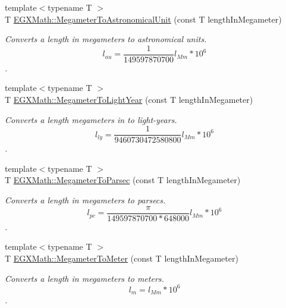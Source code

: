 \begin{DoxyCompactItemize}
\item 
{\footnotesize template$<$typename T $>$ }\\T \mbox{\hyperlink{group___e_g_x_math-_conversions-_length_conversions-_s_i-_megameter-_astronomical_gac7cc4e20e973762cb87a8934184cdf6d}{E\+G\+X\+Math\+::\+Megameter\+To\+Astronomical\+Unit}} (const T length\+In\+Megameter)
\begin{DoxyCompactList}\small\item\em Converts a length in megameters to astronomical units. \[ l_{au}= \frac{1}{149597870700} l_{Mm} * 10^{6} \]. \end{DoxyCompactList}\item 
{\footnotesize template$<$typename T $>$ }\\T \mbox{\hyperlink{group___e_g_x_math-_conversions-_length_conversions-_s_i-_megameter-_astronomical_ga6f5018465cf15f75912695e069b86795}{E\+G\+X\+Math\+::\+Megameter\+To\+Light\+Year}} (const T length\+In\+Megameter)
\begin{DoxyCompactList}\small\item\em Converts a length megameters in to light-\/years. \[ l_{ly}= \frac{1}{9460730472580800} l_{Mm} * 10^{6} \]. \end{DoxyCompactList}\item 
{\footnotesize template$<$typename T $>$ }\\T \mbox{\hyperlink{group___e_g_x_math-_conversions-_length_conversions-_s_i-_megameter-_astronomical_gaec774451afc484c6fa69d2cfcd3dbf06}{E\+G\+X\+Math\+::\+Megameter\+To\+Parsec}} (const T length\+In\+Megameter)
\begin{DoxyCompactList}\small\item\em Converts a length in megameters to parsecs. \[ l_{pc}=\frac{\pi}{149597870700 * 648000} l_{Mm} * 10^{6} \]. \end{DoxyCompactList}\item 
{\footnotesize template$<$typename T $>$ }\\T \mbox{\hyperlink{group___e_g_x_math-_conversions-_length_conversions-_s_i-_megameter-_s_i_gadd3d707010ed78d623f4fbb5b8d72338}{E\+G\+X\+Math\+::\+Megameter\+To\+Meter}} (const T length\+In\+Megameter)
\begin{DoxyCompactList}\small\item\em Converts a length in megameters to meters. \[ l_{m}=l_{Mm} * 10^{6}\]. \end{DoxyCompactList}\item 

\end{DoxyCompactItemize}
